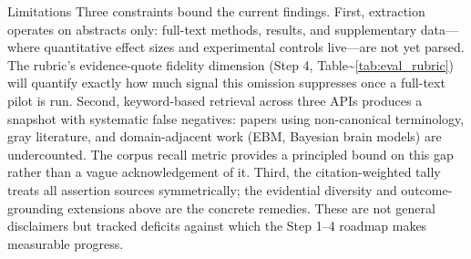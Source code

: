 \documentclass[
  ignorenonframetext,
]{beamer}
\begin{document}
\begin{frame}[allowframebreaks]{Limitations}
\protect{}\label{limitations}
Three constraints bound the current findings. First, extraction operates
on abstracts only: full-text methods, results, and supplementary
data---where quantitative effect sizes and experimental controls
live---are not yet parsed. The rubric's evidence-quote fidelity
dimension (Step 4, Table\textasciitilde{}\ref{tab:eval_rubric}) will
quantify exactly how much signal this omission suppresses once a
full-text pilot is run. Second, keyword-based retrieval across three
APIs produces a snapshot with systematic false negatives: papers using
non-canonical terminology, gray literature, and domain-adjacent work
(EBM, Bayesian brain models) are undercounted. The corpus recall metric
provides a principled bound on this gap rather than a vague
acknowledgement of it. Third, the citation-weighted tally treats all
assertion sources symmetrically; the evidential diversity and
outcome-grounding extensions above are the concrete remedies. These are
not general disclaimers but tracked deficits against which the Step 1--4
roadmap makes measurable progress.
\end{frame}
\end{document}
